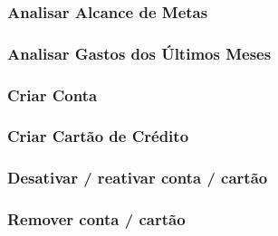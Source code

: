 \documentclass[a4paper]{abnt}
\begin{document}
\subsubsection{Analisar Alcance de Metas}
\subsubsection{Analisar Gastos dos Últimos Meses}
\subsubsection{Criar Conta}
\subsubsection{Criar Cart\~ao de Crédito}
\subsubsection{Desativar / reativar conta / cartão}
\subsubsection{Remover conta / cartão}

\pagebreak
\end{document}
